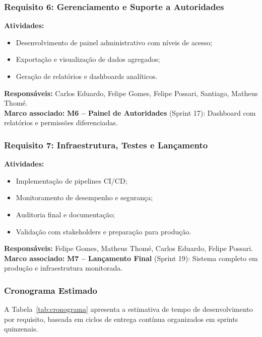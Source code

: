 \documentclass[a4paper, 12pt]{article}
\begin{document}
\subsubsection*{Requisito 6: Gerenciamento e Suporte a Autoridades}
\textbf{Atividades:}
\begin{itemize}
  \item Desenvolvimento de painel administrativo com níveis de acesso;
  \item Exportação e visualização de dados agregados;
  \item Geração de relatórios e dashboards analíticos.
\end{itemize}
\textbf{Responsáveis:} Carlos Eduardo, Felipe Gomes, Felipe Possari, Santiago, Matheus Thomé. \\
\textbf{Marco associado:} \textbf{M6 – Painel de Autoridades} (Sprint 17): Dashboard com relatórios e permissões diferenciadas.

\subsubsection*{Requisito 7: Infraestrutura, Testes e Lançamento}
\textbf{Atividades:}
\begin{itemize}
  \item Implementação de pipelines CI/CD;
  \item Monitoramento de desempenho e segurança;
  \item Auditoria final e documentação;
  \item Validação com stakeholders e preparação para produção.
\end{itemize}
\textbf{Responsáveis:} Felipe Gomes, Matheus Thomé, Carlos Eduardo, Felipe Possari. \\
\textbf{Marco associado:} \textbf{M7 – Lançamento Final} (Sprint 19): Sistema completo em produção e infraestrutura monitorada.

\subsubsection*{Cronograma Estimado}

A Tabela~\ref{tab:cronograma} apresenta a estimativa de tempo de desenvolvimento por requisito, baseada em ciclos de entrega contínua organizados em sprints quinzenais.
\end{document}
